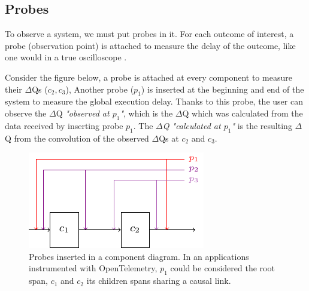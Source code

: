 \subsection{Probes}

To observe a system, we must put probes in it. For each outcome of interest, a probe (observation point) is attached to measure the delay of the outcome, like one would in a true oscilloscope \cite{post}.

Consider the figure below, a probe is attached at every component to measure their $\Delta$Qs ($c_2, c_3$),  Another probe ($p_1$) is inserted at the beginning and end of the system to measure the global execution delay. Thanks to this probe, the user can observe the $\Delta$Q \textit{"observed at $p_1$"}, which is the $\Delta$Q which was calculated from the data received by inserting probe $p_1$. The \textit{$\Delta$Q "calculated at $p_1$"} is the resulting $\Delta$Q from the convolution of the observed $\Delta$Qs at $c_2$ and $c_3$.   
    \begin{figure}[H]
        \begin{center}
            \includegraphics[scale=1.8]{tikz/probes.pdf}
        \end{center}
        \caption{Probes inserted in a component diagram. In an applications instrumented with OpenTelemetry, $p_1$ could be considered the root span, $c_1$ and $c_2$ its children spans sharing a causal link.}
        \label{fig:probes}
    \end{figure}



